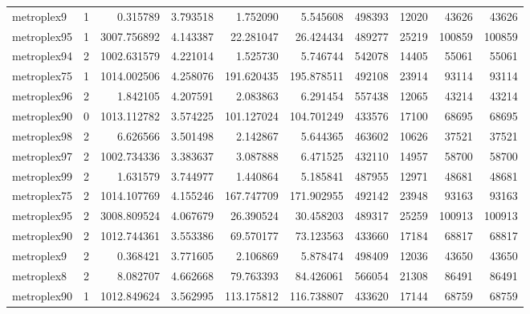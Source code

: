 \begin{longtable}{|l|r|r|r|r|r|r|r|r|r|}
metroplex9 & 1 & 0.315789 & 3.793518 & 1.752090 & 5.545608 & 498393 & 12020 & 43626 & 43626 \\
metroplex95 & 1 & 3007.756892 & 4.143387 & 22.281047 & 26.424434 & 489277 & 25219 & 100859 & 100859 \\
metroplex94 & 2 & 1002.631579 & 4.221014 & 1.525730 & 5.746744 & 542078 & 14405 & 55061 & 55061 \\
metroplex75 & 1 & 1014.002506 & 4.258076 & 191.620435 & 195.878511 & 492108 & 23914 & 93114 & 93114 \\
metroplex96 & 2 & 1.842105 & 4.207591 & 2.083863 & 6.291454 & 557438 & 12065 & 43214 & 43214 \\
metroplex90 & 0 & 1013.112782 & 3.574225 & 101.127024 & 104.701249 & 433576 & 17100 & 68695 & 68695 \\
metroplex98 & 2 & 6.626566 & 3.501498 & 2.142867 & 5.644365 & 463602 & 10626 & 37521 & 37521 \\
metroplex97 & 2 & 1002.734336 & 3.383637 & 3.087888 & 6.471525 & 432110 & 14957 & 58700 & 58700 \\
metroplex99 & 2 & 1.631579 & 3.744977 & 1.440864 & 5.185841 & 487955 & 12971 & 48681 & 48681 \\
metroplex75 & 2 & 1014.107769 & 4.155246 & 167.747709 & 171.902955 & 492142 & 23948 & 93163 & 93163 \\
metroplex95 & 2 & 3008.809524 & 4.067679 & 26.390524 & 30.458203 & 489317 & 25259 & 100913 & 100913 \\
metroplex90 & 2 & 1012.744361 & 3.553386 & 69.570177 & 73.123563 & 433660 & 17184 & 68817 & 68817 \\
metroplex9 & 2 & 0.368421 & 3.771605 & 2.106869 & 5.878474 & 498409 & 12036 & 43650 & 43650 \\
metroplex8 & 2 & 8.082707 & 4.662668 & 79.763393 & 84.426061 & 566054 & 21308 & 86491 & 86491 \\
metroplex90 & 1 & 1012.849624 & 3.562995 & 113.175812 & 116.738807 & 433620 & 17144 & 68759 & 68759 \\
\end{longtable}
